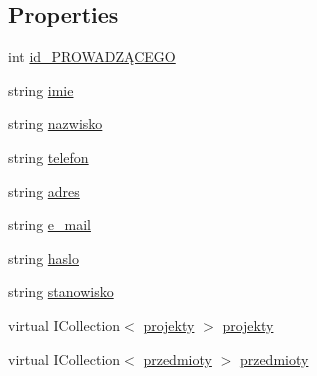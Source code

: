 \subsection*{Properties}
\begin{DoxyCompactItemize}
\item 
int \hyperlink{class_dziennik_ocen_1_1_p_r_o_w_a_d_z_xC4_x84_c_y_acc6bdcea8ce85a93a0178f4fe0cb8eaf}{id\+\_\+\+P\+R\+O\+W\+A\+D\+ZĄ\+C\+E\+GO}
\item 
string \hyperlink{class_dziennik_ocen_1_1_p_r_o_w_a_d_z_xC4_x84_c_y_aa93db07c0470f29933a7f89a93e4122e}{imie}
\item 
string \hyperlink{class_dziennik_ocen_1_1_p_r_o_w_a_d_z_xC4_x84_c_y_a905fa89ec2a910340e89c141d2e9a67e}{nazwisko}
\item 
string \hyperlink{class_dziennik_ocen_1_1_p_r_o_w_a_d_z_xC4_x84_c_y_af4c7070f4023f254005178bc581debd5}{telefon}
\item 
string \hyperlink{class_dziennik_ocen_1_1_p_r_o_w_a_d_z_xC4_x84_c_y_ab2006d7a4cb7f9793867fb346fbbab58}{adres}
\item 
string \hyperlink{class_dziennik_ocen_1_1_p_r_o_w_a_d_z_xC4_x84_c_y_a86c0ac2e52fe291aa6f3b28036b72b94}{e\+\_\+mail}
\item 
string \hyperlink{class_dziennik_ocen_1_1_p_r_o_w_a_d_z_xC4_x84_c_y_a85f95611d85ceb7e87fc80823c492790}{haslo}
\item 
string \hyperlink{class_dziennik_ocen_1_1_p_r_o_w_a_d_z_xC4_x84_c_y_a4eb7db094d62dc9de09583da17345e25}{stanowisko}
\item 
virtual I\+Collection$<$ \hyperlink{class_dziennik_ocen_1_1projekty}{projekty} $>$ \hyperlink{class_dziennik_ocen_1_1_p_r_o_w_a_d_z_xC4_x84_c_y_a2bec4c1c3b31cbfd8251c1d42f2ddd43}{projekty}
\item 
virtual I\+Collection$<$ \hyperlink{class_dziennik_ocen_1_1przedmioty}{przedmioty} $>$ \hyperlink{class_dziennik_ocen_1_1_p_r_o_w_a_d_z_xC4_x84_c_y_a9778ce332f5e910cba2fd93e9d8d6ee4}{przedmioty}
\end{DoxyCompactItemize}


